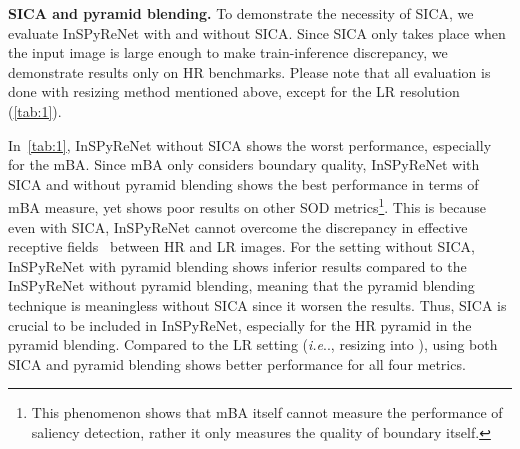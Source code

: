 \documentclass{llncs}
\makeatletter
\DeclareRobustCommand\onedot{\futurelet\@let@token\@onedot}
\def\@onedot{\ifx\@let@token.\else.\null\fi\xspace}
\def\ie{\emph{i.e}\onedot} \def\Ie{\emph{I.e}\onedot}
\makeatother
\begin{document}
    \noindent
    \textbf{SICA and pyramid blending.} To demonstrate the necessity of SICA, we evaluate InSPyReNet with and without SICA.
    Since SICA only takes place when the input image is large enough to make train-inference discrepancy, we demonstrate results only on HR benchmarks. 
    Please note that all evaluation is done with resizing method mentioned above, except for the LR resolution (\cref{tab:1}).
    
    In~\cref{tab:1}, InSPyReNet without SICA shows the worst performance, especially for the mBA. 
    Since mBA only considers boundary quality, InSPyReNet with SICA and without pyramid blending shows the best performance in terms of mBA measure, yet shows poor results on other SOD metrics\footnote{This phenomenon shows that mBA itself cannot measure the performance of saliency detection, rather it only measures the quality of boundary itself.}.
    This is because even with SICA, InSPyReNet cannot overcome the discrepancy in effective receptive fields~\cite{luo2016understanding} between HR and LR images.
    For the setting without SICA, InSPyReNet with pyramid blending shows inferior results compared to the InSPyReNet without pyramid blending, meaning that the pyramid blending technique is meaningless without SICA since it worsen the results.
    Thus, SICA is crucial to be included in InSPyReNet, especially for the HR pyramid in the pyramid blending.
    Compared to the LR setting (\ie, resizing into ), using both SICA and pyramid blending shows better performance for all four metrics.
    
\end{document}
